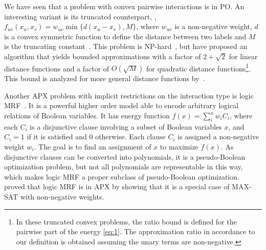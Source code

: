 We have seen that a problem with convex pairwise interactions is in PO. An interesting variant is its truncated counterpart, \ie, $f_{uv}(x_u,x_v) = w_{uv}\min\{d(x_u - x_v), M\}$, where $w_{uv}$ is a non-negative weight, $d$ is a convex symmetric function to define the distance between two labels and $M$ is the truncating constant~\cite{veksler2007graph}.
This problem is NP-hard~\cite{veksler2007graph}, but \citet{Kumar-11-improved} have proposed an algorithm that yields bounded approximations with a factor of $2+\sqrt{2}$ for linear distance functions and a factor of $O(\sqrt{M})$ for quadratic distance functions\footnote{In these truncated convex problems, the ratio bound is defined for the pairwise part of the energy \cref{eq:1}. The approximation ratio in accordance to our definition is obtained assuming the unary terms are non-negative.}. This bound is analyzed for more general distance functions by~\citet{kumar2014rounding}.

Another APX problem with implicit restrictions on the interaction type is logic MRF~\cite{bach2015unifying}. It is a powerful higher order model able to encode arbitrary logical relations of Boolean variables. It has energy function $f(x) = \sum_i^n w_iC_i$, where each $C_i$ is a disjunctive clause involving a subset of Boolean variables $x$, and $C_i = 1$ if it is satisfied and 0 otherwise. Each clause $C_i$ is assigned a non-negative weight $w_i$. The goal is to find an assignment of $x$ to maximize $f(x)$. As disjunctive clauses can be converted into polynomials, it is a pseudo-Boolean optimization problem, but not all polynomials are representable in this way, which makes logic MRF a proper subclass of pseudo-Boolean optimization. \citet{bach2015unifying} proved that logic MRF is in APX by showing that it is a special case of MAX-SAT with non-negative weights.
%

